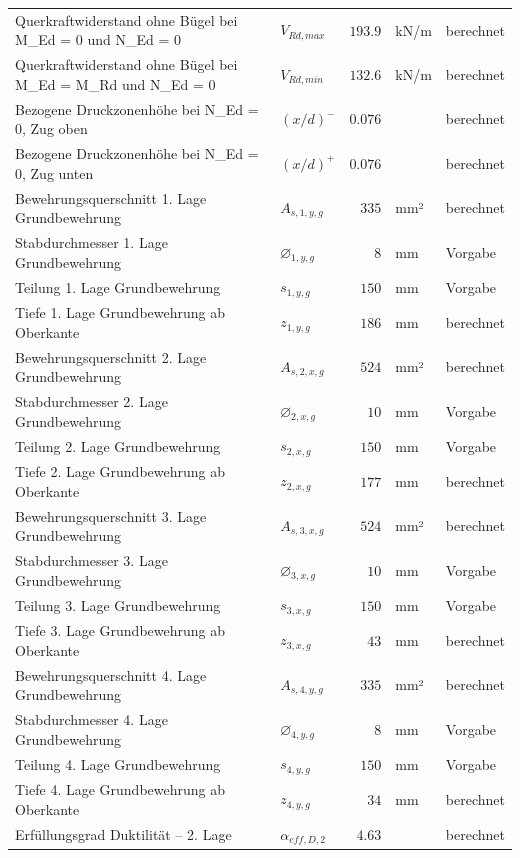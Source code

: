 \documentclass[11pt,a4paper]{article}
\begin{document}
\begin{xltabular}{\linewidth}{>{\raggedright\arraybackslash}Xlrll}
Querkraftwiderstand ohne Bügel bei M\_Ed = 0 und N\_Ed = 0 & $V_{Rd,max}$ & $193.9$ & kN/m & berechnet \\
Querkraftwiderstand ohne Bügel bei M\_Ed = M\_Rd und N\_Ed = 0 & $V_{Rd,min}$ & $132.6$ & kN/m & berechnet \\
Bezogene Druckzonenhöhe bei N\_Ed = 0, Zug oben & $\left(x/d\right)^{-}$ & $0.076$ &  & berechnet \\
Bezogene Druckzonenhöhe bei N\_Ed = 0, Zug unten & $\left(x/d\right)^{+}$ & $0.076$ &  & berechnet \\
Bewehrungsquerschnitt 1. Lage Grundbewehrung & $A_{s,1,y,g}$ & $335$ & mm² & berechnet \\
Stabdurchmesser 1. Lage Grundbewehrung & $\varnothing_{1,y,g}$ & $8$ & mm & Vorgabe \\
Teilung 1. Lage Grundbewehrung & $s_{1,y,g}$ & $150$ & mm & Vorgabe \\
Tiefe 1. Lage Grundbewehrung ab Oberkante & $z_{1,y,g}$ & $186$ & mm & berechnet \\
Bewehrungsquerschnitt 2. Lage Grundbewehrung & $A_{s,2,x,g}$ & $524$ & mm² & berechnet \\
Stabdurchmesser 2. Lage Grundbewehrung & $\varnothing_{2,x,g}$ & $10$ & mm & Vorgabe \\
Teilung 2. Lage Grundbewehrung & $s_{2,x,g}$ & $150$ & mm & Vorgabe \\
Tiefe 2. Lage Grundbewehrung ab Oberkante & $z_{2,x,g}$ & $177$ & mm & berechnet \\
Bewehrungsquerschnitt 3. Lage Grundbewehrung & $A_{s,3,x,g}$ & $524$ & mm² & berechnet \\
Stabdurchmesser 3. Lage Grundbewehrung & $\varnothing_{3,x,g}$ & $10$ & mm & Vorgabe \\
Teilung 3. Lage Grundbewehrung & $s_{3,x,g}$ & $150$ & mm & Vorgabe \\
Tiefe 3. Lage Grundbewehrung ab Oberkante & $z_{3,x,g}$ & $43$ & mm & berechnet \\
Bewehrungsquerschnitt 4. Lage Grundbewehrung & $A_{s,4,y,g}$ & $335$ & mm² & berechnet \\
Stabdurchmesser 4. Lage Grundbewehrung & $\varnothing_{4,y,g}$ & $8$ & mm & Vorgabe \\
Teilung 4. Lage Grundbewehrung & $s_{4,y,g}$ & $150$ & mm & Vorgabe \\
Tiefe 4. Lage Grundbewehrung ab Oberkante & $z_{4,y,g}$ & $34$ & mm & berechnet \\
Erfüllungsgrad Duktilität – 2. Lage & $\alpha_{eff,D,2}$ & $4.63$ &  & berechnet \\

\end{xltabular}
\end{document}
